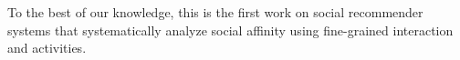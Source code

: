 To the best of our knowledge, this is the first work on social recommender systems that systematically analyze social affinity using
fine-grained interaction and activities.  


